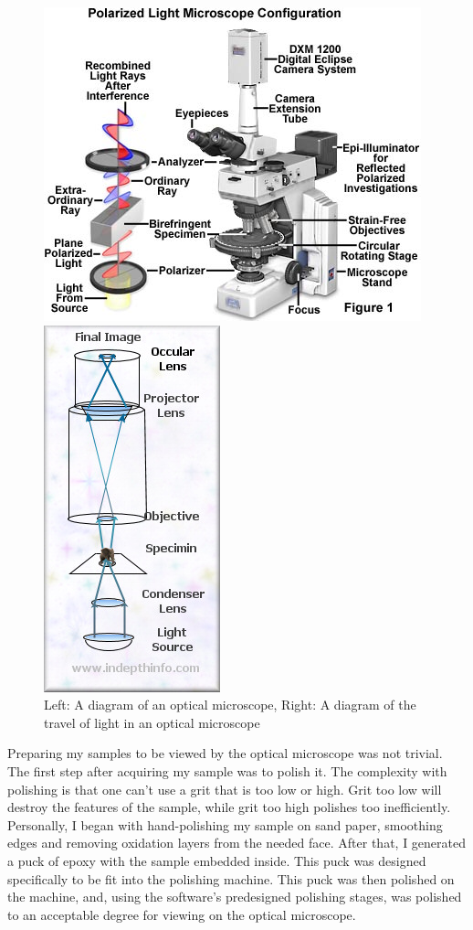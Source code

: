 \documentclass{article}
\begin{document}
\begin{figure}[h]
	\begin{minipage}{.5\textwidth}
		\centering
		\includegraphics[scale=.3]{optical1.jpg}
	\end{minipage}		
	\begin{minipage}{.5\textwidth}
		\centering
		\includegraphics[scale=1.5]{optical2.jpg}
	\end{minipage}
	\caption{Left: A diagram of an optical microscope, Right: A diagram of the travel of light in an optical microscope}
\end{figure}

Preparing my samples to be viewed by the optical microscope was not trivial. The first step after acquiring my sample was to polish it. The complexity with polishing is that one can't use a grit that is too low or high. Grit too low will destroy the features of the sample, while grit too high polishes too inefficiently. Personally, I began with hand-polishing my sample on sand paper, smoothing edges and removing oxidation layers from the needed face. After that, I generated a puck of epoxy with the sample embedded inside. This puck was designed specifically to be fit into the polishing machine. This puck was then polished on the machine, and, using the software's predesigned polishing stages, was polished to an acceptable degree for viewing on the optical microscope.
\end{document}
